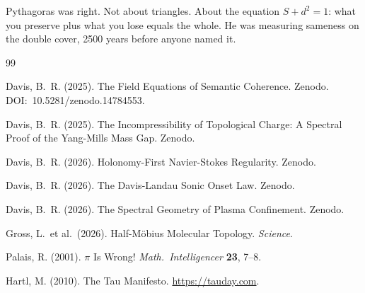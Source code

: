 \documentclass[11pt,letterpaper]{article}
\begin{document}
Pythagoras was right. Not about triangles. About the equation $S + d^2 = 1$: what you preserve plus what you lose equals the whole. He was measuring sameness on the double cover, 2500 years before anyone named it.


\begin{thebibliography}{99}

 Davis, B.~R. (2025). The Field Equations of Semantic Coherence. Zenodo. DOI:~10.5281/zenodo.14784553.

 Davis, B.~R. (2025). The Incompressibility of Topological Charge: A Spectral Proof of the Yang-Mills Mass Gap. Zenodo.

 Davis, B.~R. (2026). Holonomy-First Navier-Stokes Regularity. Zenodo.

 Davis, B.~R. (2026). The Davis-Landau Sonic Onset Law. Zenodo.

 Davis, B.~R. (2026). The Spectral Geometry of Plasma Confinement. Zenodo.

 Gross, L.\ et al.\ (2026). Half-M\"obius Molecular Topology. \emph{Science}.

 Palais, R. (2001). $\pi$ Is Wrong! \emph{Math.\ Intelligencer} \textbf{23}, 7--8.

 Hartl, M. (2010). The Tau Manifesto. \url{https://tauday.com}.

\end{thebibliography}
\end{document}
